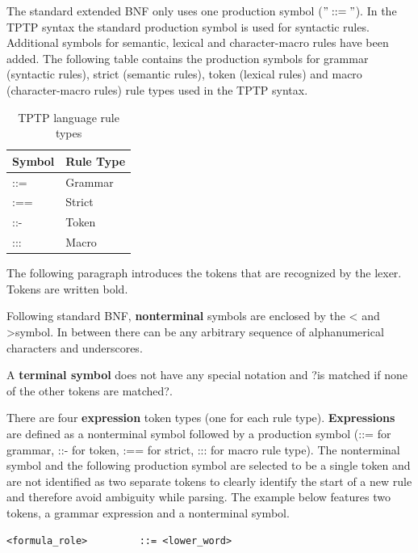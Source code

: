The standard extended BNF only uses one production symbol ($"::="$).
In the TPTP syntax the standard production symbol is used for syntactic rules.
Additional symbols for semantic, lexical and character-macro rules have been added.
The following table contains the production symbols for grammar (syntactic rules), strict (semantic rules), token (lexical rules) and macro (character-macro rules) rule types used in the TPTP syntax.

\begin{table}[H]
\centering
\renewcommand{\arraystretch}{1}
\caption{\ac{TPTP} language rule types \cite{VS06}}
\begin{tabular}{ll}
\textbf{Symbol} & \textbf{Rule Type}\\\hline
::= & Grammar\\
:== & Strict\\
::- & Token\\
::: & Macro\\
\end{tabular}
\label{tbl:ConceptTPTPProductionSymbols}
\end{table}


The following paragraph introduces the tokens that are recognized by the lexer. Tokens are written bold.

Following standard BNF, \textbf{nonterminal} symbols are enclosed by the \textless\; and \textgreater \;symbol.
In between there can be any arbitrary sequence of alphanumerical characters and underscores.

A \textbf{terminal symbol} does not have any special notation and ?is matched if none of the other tokens are matched?.

There are four \textbf{expression} token types (one for each rule type).
\textbf{Expressions} are defined as a nonterminal symbol followed by a production symbol (::= for grammar, ::- for token, :== for strict, ::: for macro rule type).
The nonterminal symbol and the following production symbol are selected to be a single token and are not identified as two separate tokens to clearly identify the start of a new rule and therefore avoid ambiguity while parsing.
The example below features two tokens, a grammar expression and a nonterminal symbol.
\begin{verbatim}
<formula_role>         ::= <lower_word>
\end{verbatim}

